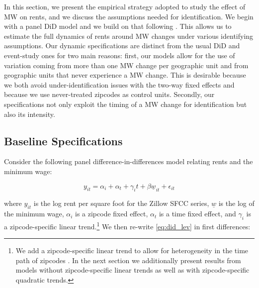 
In this section, we present the empirical strategy adopted to study the effect of MW on rents, and 
we discuss the assumptions needed for identification. We begin with a panel DiD model and we build 
on that following \textcite{meer2016effects}. This allows us to estimate the full dynamics of rents 
around MW changes under various identifying assumptions. Our dynamic specifications are distinct 
from the usual DiD and event-study ones \parencite{BorusyakJaravel2017, abraham2018} for two main 
reasons: first, our models allow for the use of variation coming from more than one MW change per 
geographic unit and from geographic units that never experience a MW change. This is desirable 
because we both avoid under-identification issues with the two-way fixed effects and because we 
use never-treated zipcodes as control units. Secondly, our specifications not only exploit the 
timing of a MW change for identification but also its intensity.
    


\subsection{Baseline Specifications}
Consider the following panel difference-in-differences model relating rents and the minimum wage:

\begin{equation}\label{eq:did_lev}
    y_{it} = \alpha_i + \alpha_t + \gamma_i t + \beta \underline{w}_{it} + \epsilon_{it}
\end{equation}
    
where $y_{it}$ is the log rent per square foot for the Zillow SFCC series, $\underline{w}$ is the 
log of the minimum wage, $\alpha_i$ is a zipcode fixed effect, $\alpha_t$ is a time fixed effect, 
and $\gamma_i$ is a zipcode-specific linear trend.\footnote{We add a zipcode-specific linear trend 
	to allow for heterogeneity in the time path of zipcodes \parencite{angrist2008mostly}. In the 
	next section we additionally present results from models without zipcode-specific linear trends 
	as well as with zipcode-specific quadratic trends.} 
We then re-write \autoref{eq:did_lev} in first differences:
    
